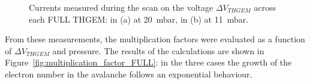 \documentclass[a4paper, 11 pt]{article}
\newcommand{\Vthgem}{$\Delta V_{THGEM}$}
\begin{document}
\begin{figure}[!htb]
	\centering
	\caption{Currents measured during the scan on the voltage \Vthgem{} across each FULL THGEM: in (a) at 20~mbar, in (b) at 11~mbar.}
	\label{fig:thgem_FULLTHGEM_other_pressure}
\end{figure}


From these measurements, the multiplication factors were evaluated as a function of \Vthgem{} and pressure.
The results of the calculations are shown in Figure~\ref{fig:multiplication_factor_FULL}: in the three cases the growth of the electron number in the avalanche follows an exponential behaviour.
\end{document}
